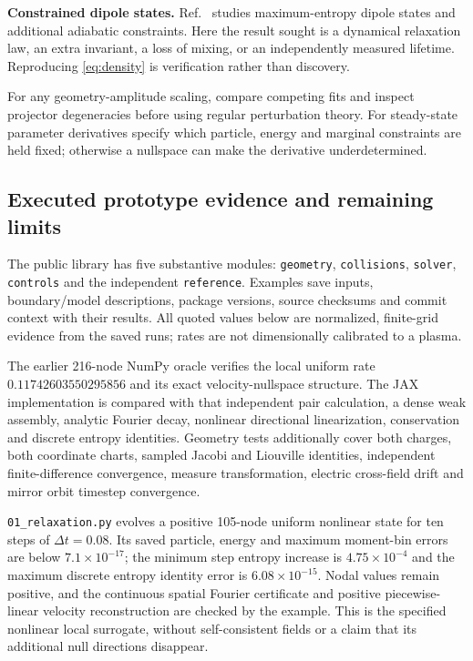 \documentclass[11pt,letterpaper]{article}
\begin{document}
\textbf{Constrained dipole states.} Ref.~\cite{S23} studies maximum-entropy dipole
states and additional adiabatic constraints. Here the result sought is a dynamical
relaxation law, an extra invariant, a loss of mixing, or an independently measured
lifetime. Reproducing \eqref{eq:density} is verification rather than discovery.

For any geometry-amplitude scaling, compare competing fits and inspect projector
degeneracies before using regular perturbation theory. For steady-state parameter
derivatives specify which particle, energy and marginal constraints are held
fixed; otherwise a nullspace can make the derivative underdetermined.

\subsection*{Executed prototype evidence and remaining limits}

The public library has five substantive modules: \texttt{geometry},
\texttt{collisions}, \texttt{solver}, \texttt{controls} and the independent
\texttt{reference}. Examples save inputs, boundary/model descriptions, package
versions, source checksums and commit context with their results. All quoted
values below are normalized, finite-grid evidence from the saved runs; rates
are not dimensionally calibrated to a plasma.

The earlier 216-node NumPy oracle verifies the local uniform rate
$0.11742603550295856$ and its exact velocity-nullspace structure. The JAX
implementation is compared with that independent pair calculation, a dense
weak assembly, analytic Fourier decay, nonlinear directional linearization,
conservation and discrete entropy identities. Geometry tests additionally cover
both charges, both coordinate charts, sampled Jacobi and Liouville identities,
independent finite-difference convergence, measure transformation, electric
cross-field drift and mirror orbit timestep convergence.

\texttt{01\_relaxation.py} evolves a positive 105-node uniform nonlinear state for
ten steps of $\Delta t=0.08$. Its saved particle, energy and maximum moment-bin
errors are below $7.1\times10^{-17}$; the minimum step entropy increase is
$4.75\times10^{-4}$ and the maximum discrete entropy identity error is
$6.08\times10^{-15}$. Nodal values remain positive, and the continuous spatial Fourier certificate
and positive piecewise-linear velocity reconstruction are checked by the example.
This is the specified nonlinear local surrogate, without self-consistent fields
or a claim that its additional null directions disappear.
\end{document}
